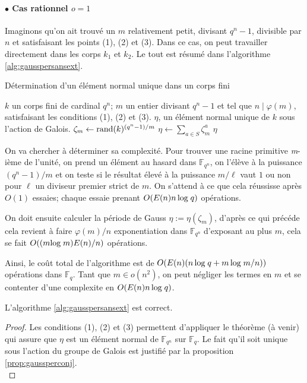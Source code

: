 \documentclass[a4paper]{article} %
\numberwithin{section}{part}
\numberwithin{equation}{section}
\newcommand\nroot[1]{\textit{#1}-ième}
\newcommand\GF[1]{\mathbb{F}_{#1}}
\begin{document}
\paragraph{$\bullet$ Cas rationnel $o = 1$}
Imaginons qu'on ait trouvé un $m$ relativement petit, divisant $q^n - 1$,
divisible par $n$ et satisfaisant les points (1), (2) et (3). Dans ce cas, on 
peut travailler directement dans les corps $k_1$ et $k_2$. Le tout est résumé
dans l'algorithme \ref{alg:gausspersansext}.

\begin{algorithm}
\caption{Détermination d'un élément normal unique dans un corps fini}
\label{alg:gausspersansext}
\begin{algorithmic}[1]
\REQUIRE $k$ un corps fini de cardinal $q^n$; $m$ un entier 
divisant $q^n - 1$ et tel que $n\mid\varphi(m)$, satisfaisant les conditions 
(1), (2) et (3).
\ENSURE $\eta$, un élément normal unique de $k$ sous l'action de Galois.
\bigskip
\REPEAT
    \STATE $\zeta_m \leftarrow \textup{rand}(k)^{(q^n - 1)/m}$
\STATE $\eta \leftarrow \sum_{a\in S}{\zeta_m^a}$
\RETURN $\eta$
\end{algorithmic}
\end{algorithm}
On va chercher à déterminer sa complexité. Pour trouver une racine primitive 
\nroot{m} de l'unité, on prend un élément au hasard dans $\GF{q^n}$, on l'élève 
à la puissance $(q^n - 1)/m$ et on teste si le résultat élevé à la puissance 
$m/\ell$ vaut $1$ ou non pour $\ell$ un diviseur premier strict de $m$. On 
s'attend à ce que cela réussisse après $O(1)$ essaies; chaque essaie prenant 
$O(E(n)n\,\textup{log\;}q)$ opérations.\par
On doit ensuite calculer la période de Gauss $\eta := \eta(\zeta_m)$,
d'après ce qui précéde cela revient à faire $\varphi(m)/n$ exponentiation dans
$\GF{q^n}$ d'exposant au plus $m$, cela se fait $O((m\textup{log\;}m)E(n)/n)$
opérations.\par
Ainsi, le coût total de l'algorithme est de $O(E(n)(n\,\textup{log\;}q +
m\,\textup{log\;}m/n))$ opérations dans $\GF{q}$. Tant que $m\in o(n^2)$, on 
peut négliger les termes en $m$ et se contenter d'une complexite en 
$O(E(n)n\,\textup{log\;}q)$.

\begin{prop}
L'algorithme \ref{alg:gausspersansext} est correct.
\end{prop}
\begin{proof}
Les conditions (1), (2) et (3) permettent d'appliquer le théorème (à venir) qui 
assure que $\eta$ est un élément normal de $\GF{q^n}$ sur $\GF{q}$. Le 
fait qu'il soit unique sous l'action du groupe de Galois est justifié par la 
proposition \ref{prop:gaussperconj}.\\
\end{proof}
\end{document}
